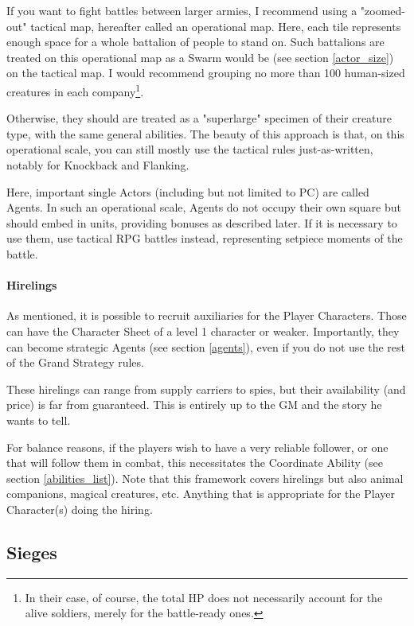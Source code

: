If you want to fight battles between larger armies, I recommend using a "zoomed-out" tactical map, hereafter called an operational map. Here, each tile represents enough space for a whole battalion of people to stand on. Such battalions are treated on this operational map as a Swarm would be (see section \ref{actor_size}) on the tactical map. I would recommend grouping no more than 100 human-sized creatures in each company\footnote{In their case, of course, the total HP does not necessarily account for the alive soldiers, merely for the battle-ready ones.}.

Otherwise, they should are treated as a "superlarge" specimen of their creature type, with the same general abilities. The beauty of this approach is that, on this operational scale, you can still mostly use the tactical rules just-as-written, notably for Knockback and Flanking.

Here, important single Actors (including but not limited to PC) are called Agents. In such an operational scale, Agents do not occupy their own square but should embed in units, providing bonuses as described later. If it is necessary to use them, use tactical RPG battles instead, representing setpiece moments of the battle.


\paragraph{Hirelings}

As mentioned, it is possible to recruit auxiliaries for the Player Characters. Those can have the Character Sheet of a level 1 character or weaker. Importantly, they can become strategic Agents (see section \ref{agents}), even if you do not use the rest of the Grand Strategy rules.

These hirelings can range from supply carriers to spies, but their availability (and price) is far from guaranteed. This is entirely up to the GM and the story he wants to tell.

For balance reasons, if the players wish to have a very reliable follower, or one that will follow them in combat, this necessitates the Coordinate Ability (see section \ref{abilities_list}). Note that this framework covers hirelings but also animal companions, magical creatures, etc. Anything that is appropriate for the Player Character(s) doing the hiring.

\subsection{Sieges}


